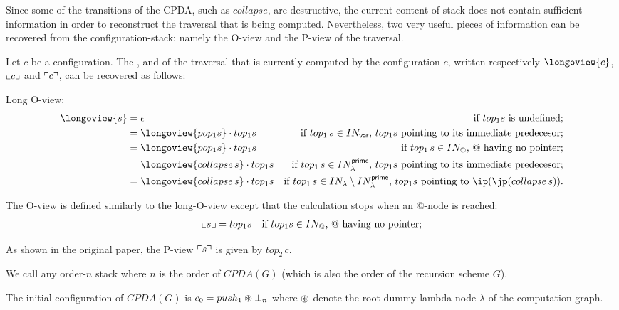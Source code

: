 \documentclass[a4paper]{article}
\theoremstyle{remark}
\theoremstyle{definition}
\newcommand\INodes{IN}%
\begin{document}
Since some of the transitions of the CPDA, such as $collapse$, are destructive, the current content of stack does not contain sufficient information in order to reconstruct the traversal that is being computed.
Nevertheless, two very useful pieces of information can be recovered from the configuration-stack: namely the O-view and the P-view of the traversal.

Let $c$ be a configuration. The ,
 and  of the traversal that is currently computed by the configuration $c$, written respectively $\longoview{c}$, $\llcorner c \lrcorner$ and $\ulcorner c \urcorner$, can be recovered as follows:
\begin{compactitem}
\item Long O-view:
\begin{align*}
  \longoview{s} &= \epsilon & \mbox{if $top_1 s$ is undefined;} \\
      &=   \longoview{pop_1 s} \cdot top_1 s & \mbox{if $top_1\,s \in \INodes_{\sf var}$, $top_1 s$ pointing to its immediate predecesor;} \\
      &=   \longoview{pop_1 s} \cdot top_1 s & \mbox{if $top_1\,s \in \INodes_@$, $@$ having no pointer;} \\
      &=   \longoview{collapse\,s} \cdot top_1 s & \mbox{if $top_1\,s \in \INodes_\lambda^{\sf prime}$, $top_1 s$ pointing to its immediate predecesor;} \\
      &=   \longoview{collapse\,s} \cdot top_1 s & \mbox{if $top_1\,s \in \INodes_\lambda\setminus \INodes_\lambda^{\sf prime}$, $top_1 s$ pointing to $\ip(\jp(collapse\,s))$.} \\
\end{align*}
\item The O-view is defined similarly to the long-O-view except that the calculation stops when an @-node is reached:
\begin{align*}
  \oview{s}  &=   top_1 s & \mbox{if $top_1 s \in \INodes_@$, $@$ having no pointer;}
\end{align*}
\item As shown in the original paper, the P-view $\ulcorner s \urcorner$ is given by $top_2\,c$.
\end{compactitem}
\bigskip

We call  any order-$n$ stack where $n$ is the order
of $CPDA(G)$ (which is also the order of the recursion scheme $G$).

The initial configuration of $CPDA(G)$ is $c_0 = push_1 \circledast \bot_n$
where $\circledast$ denote the root dummy lambda node $\lambda$ of the computation graph.
\end{document}
